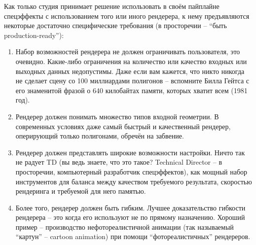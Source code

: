  Как только студия принимает решение использовать в
    своём пайплайне спецэффекты с использованием того или иного
    рендерера, к нему предъявляются некоторые достаточно специфические
    требования (в просторечии – “быть production-ready”):

	\begin{enumerate}

\item  Набор возможностей рендерера не должен
    ограничивать пользователя, это очевидно. Какие-либо ограничения на
    количество или качество входных или выходных данных недопустимы.
    Даже если вам кажется, что никто никогда не сделает сцену со 100
    миллиардами полигонов – вспомните Билла Гейтса с его знаменитой
    фразой о 640 килобайтах памяти, которых хватит всем (1981
    год).
  

\item                  Рендерер должен понимать множество типов
    входной геометрии. В современных условиях даже самый быстрый и
    качественный рендерер, оперирующий только полигонами, обречён на
    забвение.
  

\item                   Рендерер должен представлять широкие
    возможности настройки. Ничто так не радует TD (вы ведь
    знаете, что это такое? Technical Director – в
    просторечии, компьютерный разработчик спецэффектов), как мощный
    набор инструментов для баланса между качеством требуемого
    результата, скоростью рендеринга и требуемой для него
    памятью.
  

\item                   Более того, рендерер должен быть гибким.
    Лучшее доказательство гибкости рендерера – это когда его используют
    не по прямому назначению. Хороший пример – производство
    нефотореалистичной анимации (так называемый “картун” – cartoon animation) при
    помощи “фотореалистичных” рендереров.
  


\end{enumerate}
